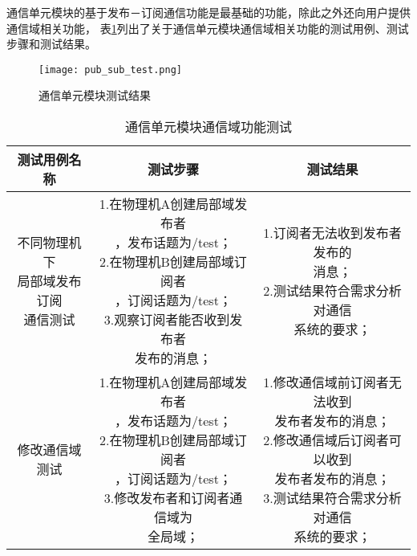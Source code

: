 通信单元模块的基于发布－订阅通信功能是最基础的功能，除此之外还向用户提供通信域相关功能，
表\ref{communication_unit_communication_domain}列出了关于通信单元模块通信域相关功能的测试用例、测试步骤和测试结果。

\begin{figure}[H]
  \centering
  \texttt{[image: pub\_sub\_test.png]}
  \caption{通信单元模块测试结果}
  \label{pub_sub_test}
\end{figure}

\begin{table}[H]
  \centering\small
  \caption{通信单元模块通信域功能测试}
  \renewcommand\arraystretch{1.2}
  \label{communication_unit_communication_domain}
  \begin{tabular}{ccc}
    \toprule
    测试用例名称 & 测试步骤 & 测试结果 \\
    \midrule
    \makecell[l]{不同物理机下\\局部域发布订阅\\通信测试}& \makecell[l]{1.在物理机A创建局部域发布者\\，发布话题为/test；\\2.在物理机B创建局部域订阅者\\，订阅话题为/test；\\3.观察订阅者能否收到发布者\\发布的消息；} & \makecell[l]{1.订阅者无法收到发布者发布的\\消息；\\2.测试结果符合需求分析对通信\\系统的要求；}\\
    \hline
    修改通信域测试 & \makecell[l]{1.在物理机A创建局部域发布者\\，发布话题为/test；\\2.在物理机B创建局部域订阅者\\，订阅话题为/test；\\3.修改发布者和订阅者通信域为\\全局域；} & \makecell[l]{1.修改通信域前订阅者无法收到\\发布者发布的消息；\\2.修改通信域后订阅者可以收到\\发布者发布的消息；\\3.测试结果符合需求分析对通信\\系统的要求；} \\
    \bottomrule
  \end{tabular}
\end{table}


